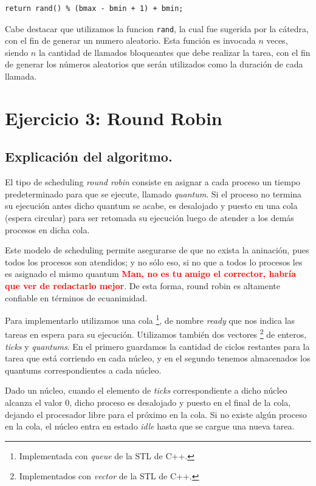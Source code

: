 \documentclass[a4paper]{article}
\begin{document}
\begin{verbatim}
return rand() % (bmax - bmin + 1) + bmin;
\end{verbatim}

Cabe destacar que utilizamos la funcion \verb|rand|, la cual fue sugerida
por la cátedra, con el fin de generar un numero aleatorio. Esta función es
invocada $n$ veces, siendo $n$ la cantidad de llamados bloqueantes que debe
realizar la tarea, con el fin de generar los números aleatorios que serán
utilizados como la duración de cada llamada.


\section{Ejercicio 3: Round Robin}

\subsection{Explicación del algoritmo.}
El tipo de scheduling \textit{round robin} consiste en asignar a cada
proceso un tiempo predeterminado para que se ejecute, llamado
\textit{quantum}. Si el proceso no termina su ejecución antes dicho quantum
se acabe, es desalojado y puesto en una cola (espera circular) para ser
retomada su ejecución luego de atender a los demás procesos en dicha cola.

Este modelo de scheduling permite asegurarse de que no exista la aninación,
pues todos los procesos son atendidos; y no sólo eso, si no que a todos lo
procesos les es asignado el mismo quantum \textbf{\textcolor{red}{Man, no es
tu amigo el corrector, habría que ver de redactarlo mejor}}. De esta
forma, round robin es altamente confiable en términos de ecuanimidad.

Para implementarlo utilizamos una cola \footnote{Implementada con
\textit{queue} de la STL de C++.}, de nombre
\textit{ready} que nos indica las tareas en espera para su ejecución.
Utilizamos también dos vectores \footnote{Implementados con
\textit{vector} de la STL de C++.} de enteros, \textit{ticks} y
\textit{quantums}. En el primero guardamos la cantidad de ciclos restantes
para la tarea que está corriendo en cada núcleo, y en el segundo tenemos
almacenados los quantums correspondientes a cada núcleo. 

Dado un núcleo, cuando el elemento de \textit{ticks} correspondiente a dicho
núcleo alcanza el valor $0$, dicho proceso es desalojado y puesto en el
final de la cola, dejando el procesador libre para el próximo en la cola.
Si no existe algún proceso en la cola, el núcleo entra en estado
\textit{idle} hasta que se cargue una nueva tarea.
\end{document}

